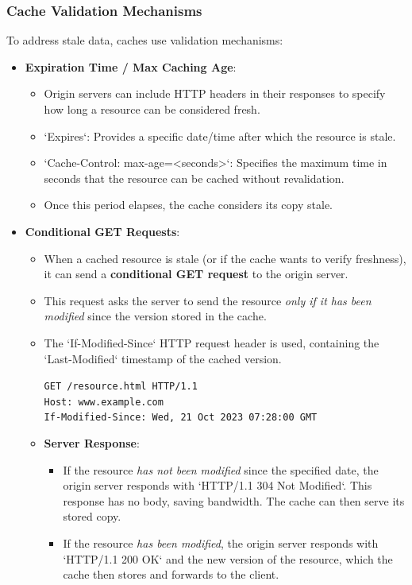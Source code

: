 \documentclass[../../compsys.tex]{subfiles}
\begin{document}
\subsubsection{Cache Validation Mechanisms}
To address stale data, caches use validation mechanisms:
\begin{itemize}
    \item \textbf{Expiration Time / Max Caching Age}:
    \begin{itemize}
        \item Origin servers can include HTTP headers in their responses to specify how long a resource can be considered fresh.
            \item `Expires`: Provides a specific date/time after which the resource is stale.
            \item `Cache-Control: max-age=<seconds>`: Specifies the maximum time in seconds that the resource can be cached without revalidation.
        \item Once this period elapses, the cache considers its copy stale.
    \end{itemize}
    \item \textbf{Conditional GET Requests}:
    \begin{itemize}
        \item When a cached resource is stale (or if the cache wants to verify freshness), it can send a \textbf{conditional GET request} to the origin server.
        \item This request asks the server to send the resource \textit{only if it has been modified} since the version stored in the cache.
        \item The `If-Modified-Since` HTTP request header is used, containing the `Last-Modified` timestamp of the cached version.
        \begin{center}
        \texttt{GET /resource.html HTTP/1.1 \\
        Host: www.example.com \\
        If-Modified-Since: Wed, 21 Oct 2023 07:28:00 GMT}
        \end{center}
        \item \textbf{Server Response}:
            \begin{itemize}
                \item If the resource \textit{has not been modified} since the specified date, the origin server responds with `HTTP/1.1 304 Not Modified`. This response has no body, saving bandwidth. The cache can then serve its stored copy.
                \item If the resource \textit{has been modified}, the origin server responds with `HTTP/1.1 200 OK` and the new version of the resource, which the cache then stores and forwards to the client.
            \end{itemize}
    \end{itemize}
\end{itemize}
\end{document}
